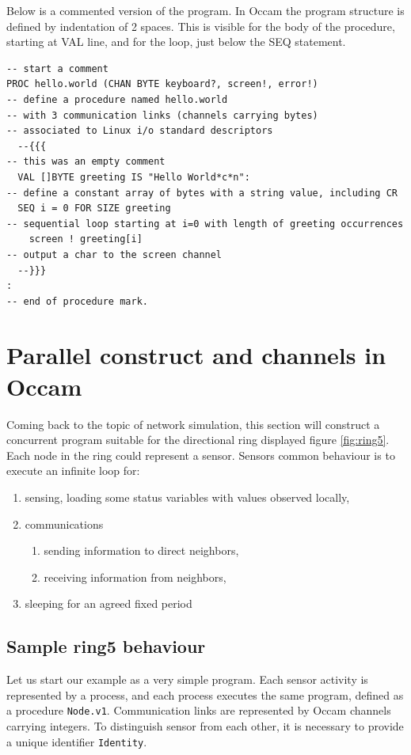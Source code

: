 \documentclass[times]{book}
\begin{document}
Below is a commented version of the program. In Occam
the program structure is defined by indentation of 2 spaces. This
is visible for the body of the procedure, starting at VAL line,
and for the loop, just below the SEQ statement.

\begin{lstlisting}  
-- start a comment
PROC hello.world (CHAN BYTE keyboard?, screen!, error!)
-- define a procedure named hello.world
-- with 3 communication links (channels carrying bytes) 
-- associated to Linux i/o standard descriptors
  --{{{
-- this was an empty comment
  VAL []BYTE greeting IS "Hello World*c*n":
-- define a constant array of bytes with a string value, including CR
  SEQ i = 0 FOR SIZE greeting
-- sequential loop starting at i=0 with length of greeting occurrences
    screen ! greeting[i]
-- output a char to the screen channel
  --}}}
:
-- end of procedure mark.
\end{lstlisting} 


\section{Parallel construct and channels in Occam}

Coming back to the topic of network simulation, this section will construct
a concurrent program suitable for the directional ring displayed figure \ref{fig:ring5}.
Each node in the ring could represent a sensor. Sensors common behaviour is to execute
an infinite loop for:
\begin{enumerate}
\item sensing, loading some status variables with values observed locally,
\item communications
\begin{enumerate}
\item sending information to direct neighbors,
\item receiving information from neighbors,
\end{enumerate}
\item sleeping for an agreed fixed period
\end{enumerate}

\subsection {Sample ring5 behaviour }

Let us start our example as a very simple program. Each sensor activity is represented
by a process, and each process executes the same program, defined as a procedure
{\tt Node.v1}. Communication links are represented by Occam channels carrying integers.
To distinguish sensor from each other, it is necessary to provide a unique identifier {\tt Identity}.
\end{document}
